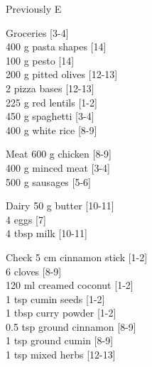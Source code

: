\begin{menu}{Previously E}
\begin{shoppinglist}{Groceries}
        {\scriptsize[3-4]}\\
      400 g pasta shapes 
        {\scriptsize[14]}\\
      100 g pesto 
        {\scriptsize[14]}\\
      200 g pitted olives 
        {\scriptsize[12-13]}\\
      2  pizza bases 
        {\scriptsize[12-13]}\\
      225 g red lentils 
        {\scriptsize[1-2]}\\
      450 g spaghetti 
        {\scriptsize[3-4]}\\
      400 g white rice 
        {\scriptsize[8-9]}\\
      \end{shoppinglist}%
      \par\vfil %
      \begin{shoppinglist}{Meat}
      600 g chicken 
        {\scriptsize[8-9]}\\
      400 g minced meat 
        {\scriptsize[3-4]}\\
      500 g sausages 
        {\scriptsize[5-6]}\\
      \end{shoppinglist}%
      \begin{shoppinglist}{Dairy}
      50 g butter 
        {\scriptsize[10-11]}\\
      4  eggs 
        {\scriptsize[7]}\\
      4 tbsp milk 
        {\scriptsize[10-11]}\\
      \end{shoppinglist}%
      \par\vfil %
      \vfil\clearpage %
      \begin{shoppinglist}{Check}
      5 cm cinnamon stick 
        {\scriptsize[1-2]}\\
      6  cloves 
        {\scriptsize[8-9]}\\
      120 ml creamed coconut 
        {\scriptsize[1-2]}\\
      1 tsp cumin seeds 
        {\scriptsize[1-2]}\\
      1 tbsp curry powder 
        {\scriptsize[1-2]}\\
      0.5 tsp ground cinnamon 
        {\scriptsize[8-9]}\\
      1 tsp ground cumin 
        {\scriptsize[8-9]}\\
      1 tsp mixed herbs 
        {\scriptsize[12-13]}\\

\end{shoppinglist}
\end{menu}
